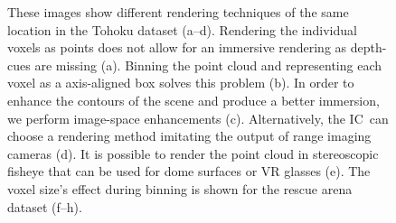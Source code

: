 \documentclass[conference,10pt,letter]{IEEEtran}
\def\IC{IC}
\begin{document}
\begin{figure}
{        \label{fig:cloud:25}
    }
    \caption{These images show different rendering techniques of the same location in the Tohoku dataset (a--d). Rendering the individual voxels as points does not allow for an immersive rendering as depth-cues are missing (a). Binning the point cloud and representing each voxel as a axis-aligned box solves this problem (b). In order to enhance the contours of the scene and produce a better immersion, we perform image-space enhancements (c). Alternatively, the \IC\ can choose a rendering method imitating the output of range imaging cameras (d). It is possible to render the point cloud in stereoscopic fisheye that can be used for dome surfaces or VR glasses (e). The voxel size's effect during binning is shown for the rescue arena dataset (f--h).}
    \label{fig:cloud}
\end{figure}


%
%
\end{document}
